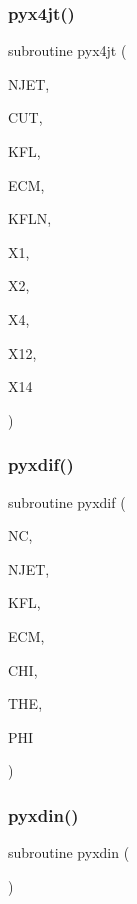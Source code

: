 \subsubsection{\texorpdfstring{pyx4jt()}{pyx4jt()}}
{\footnotesize\ttfamily subroutine pyx4jt (\begin{DoxyParamCaption}\item[{}]{N\+J\+ET,  }\item[{}]{C\+UT,  }\item[{}]{K\+FL,  }\item[{}]{E\+CM,  }\item[{}]{K\+F\+LN,  }\item[{}]{X1,  }\item[{}]{X2,  }\item[{}]{X4,  }\item[{}]{X12,  }\item[{}]{X14 }\end{DoxyParamCaption})}

\mbox{\label{pythia-6_84_824_8f_a8c4e67bd02e0c6e202fd31548c976419}} 
\subsubsection{\texorpdfstring{pyxdif()}{pyxdif()}}
{\footnotesize\ttfamily subroutine pyxdif (\begin{DoxyParamCaption}\item[{}]{NC,  }\item[{}]{N\+J\+ET,  }\item[{}]{K\+FL,  }\item[{}]{E\+CM,  }\item[{}]{C\+HI,  }\item[{}]{T\+HE,  }\item[{}]{P\+HI }\end{DoxyParamCaption})}

\mbox{\label{pythia-6_84_824_8f_ab95e134e2b1bd1f755046578bf681217}} 
\subsubsection{\texorpdfstring{pyxdin()}{pyxdin()}}
{\footnotesize\ttfamily subroutine pyxdin (\begin{DoxyParamCaption}{ }\end{DoxyParamCaption})}

